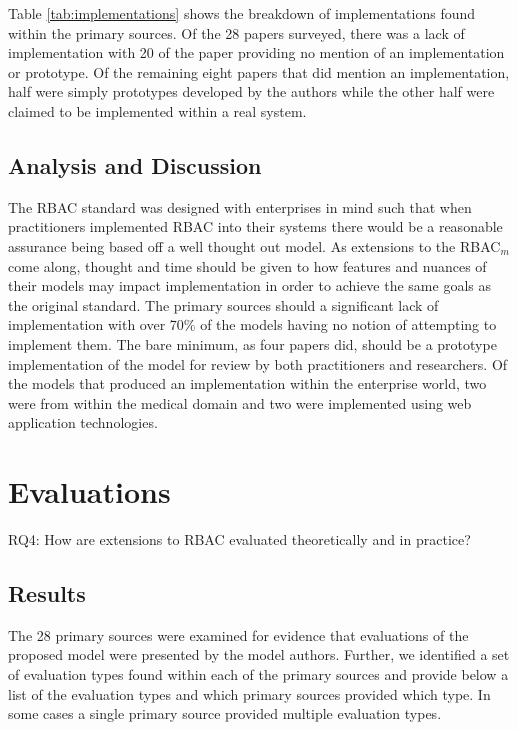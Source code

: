 Table \ref{tab:implementations} shows the breakdown of implementations found within the primary sources.
Of the 28 papers surveyed, there was a lack of implementation with 20 of the paper providing no
mention of an implementation or prototype.  Of the remaining eight papers that did mention an implementation, half 
were simply prototypes developed by the authors while the other half were claimed to be implemented within a real
system.

\subsection{Analysis and Discussion}

The RBAC standard was designed with enterprises in mind such that when practitioners implemented RBAC into their systems
there would be a reasonable assurance being based off a well thought out model.  As extensions to the RBAC$_{m}$
come along, thought and time should be given to how features and nuances of their models may impact implementation
in order to achieve the same goals as the original standard.  The primary sources should a significant lack of implementation
with over 70\% of the models having no notion of attempting to implement them.  The bare minimum, as four papers did, should be
a prototype implementation of the model for review by both practitioners and researchers. Of the models that produced an 
implementation within the enterprise world, two were from within the medical domain and two were implemented using web application technologies.  

\section{Evaluations} \label{sec:evaluations}

RQ4: How are extensions to RBAC evaluated theoretically and in practice?

\subsection{Results}

The 28 primary sources were examined for evidence that evaluations of the proposed model were presented by the model authors.
Further, we identified a set of evaluation types found within  each of the primary sources and provide below a list of the 
evaluation types and which primary sources provided which type.  In some cases a single primary source provided multiple evaluation
types.

